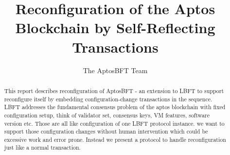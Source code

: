 \documentclass[letterpaper,10pt]{article}
\newcommand{\LBFT}{LBFT\xspace}
\begin{document}
\title{Reconfiguration of the Aptos Blockchain by Self-Reflecting Transactions}
\author{The AptosBFT Team}
\date{}
\maketitle


\newcommand{\myomit}[1]{}

\begin{abstract}
This report describes reconfiguration of AptosBFT - an extension to \LBFT to support reconfigure itself
 by embedding configuration-change transactions in the sequence.
\LBFT addresses the fundamental consensus problem of the aptos blockchain with fixed configuration setup,
think of validator set, consensus keys, VM features, software version etc.
Those are all like configuration of one \LBFT protocol instance. we want to support those configuration changes
without human intervention which could be excessive work and error prone. Instead we present
a protocol to handle reconfiguration just like a normal transaction.
\end{abstract}






\begingroup


\endgroup
\end{document}

